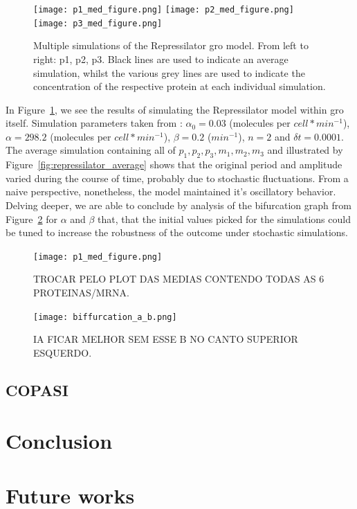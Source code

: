 \documentclass[12pt]{article}
\begin{document}
    \begin{figure}[ht]
    \centering
      \texttt{[image: p1\_med\_figure.png]}
    \endminipage\hfill
      \texttt{[image: p2\_med\_figure.png]}
    \endminipage\hfill
      \texttt{[image: p3\_med\_figure.png]}
    \endminipage
    \caption{Multiple simulations of the Repressilator gro model. From left to right: p1, p2, p3. Black lines are used to indicate an average simulation, whilst the various grey lines are used to indicate the concentration of the respective protein at each individual simulation.}
    \label{fig:tons_of_simulations}
    \end{figure}
    
   In Figure~\ref{fig:tons_of_simulations}, we see the results of simulating the Repressilator model within gro itself. Simulation parameters taken from \cite{ingalls2013mathematical}: $\alpha_{0} = 0.03$ (molecules per $cell*min^{-1}$), $\alpha = 298.2$ (molecules per $cell*min^{-1}$), $\beta = 0.2$ ($min^{-1}$), $n = 2$ and $\delta t = 0.0001$. The average simulation containing all of $p_{1}, p_{2}, p_{3}, m_{1}, m_{2}, m_{3}$ and illustrated by Figure~\ref{fig:repressilator_average} shows that the original period and amplitude varied during the course of time, probably due to stochastic fluctuations. From a naive perspective, nonetheless, the model maintained it's oscillatory behavior. Delving deeper, we are able to conclude by analysis of the bifurcation graph from Figure~\ref{fig:biffurcation} for $\alpha$ and $\beta$ that, that the initial values picked for the simulations could be tuned to increase the robustness of the outcome under stochastic simulations.

    \begin{figure}[ht]
    \centering
      \texttt{[image: p1\_med\_figure.png]}
      \caption{TROCAR PELO PLOT DAS MEDIAS CONTENDO TODAS AS 6 PROTEINAS/MRNA.}
      \label{fig:repressilator_average}
    \endminipage\hfill
      \texttt{[image: biffurcation\_a\_b.png]}
      \caption{IA FICAR MELHOR SEM ESSE B NO CANTO SUPERIOR ESQUERDO.}
      \label{fig:biffurcation}
    \endminipage\hfill
    \end{figure}

\subsection{COPASI}
    \lipsum[1]

\section{Conclusion}
    \lipsum[1]
    
\section{Future works}
    \lipsum[1]



\end{document}
